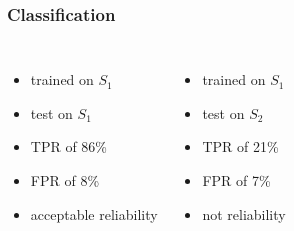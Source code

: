 \begin{frame}
	\frametitle{Classification}
	
	\begin{columns}[c]
		
		
		\begin{itemize}
			\item trained on $S_1$
			\item test on $S_1$
			\item TPR of 86\%
			\item FPR of 8\%
			\item acceptable reliability
		\end{itemize}
		
		
		\begin{itemize}
			\item trained on $S_1$
			\item test on $S_2$
			\item TPR of 21\%
			\item FPR of 7\%
			\item not reliability
		\end{itemize}	
		
	\end{columns}
	
\end{frame}